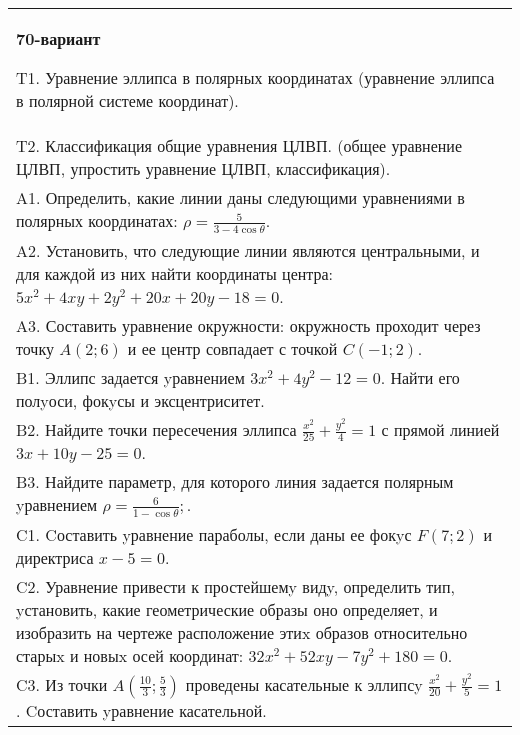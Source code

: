 \documentclass{article}
\begin{document}
\begin{tabular}{m{17cm}}
\textbf{70-вариант}
\newline

T1. Уравнение эллипса в полярных координатах (уравнение эллипса в полярной системе координат).\\

T2. Классификация общие уравнения ЦЛВП. (общее уравнение ЦЛВП, упростить уравнение ЦЛВП, классификация).\\

A1. Определить, какие линии даны следующими уравнениями в полярных координатах: $\rho=\frac{5}{3-4\cos\theta}$.\\

A2. Установить, что следующие линии являются центральными, и для каждой из них найти координаты центра: $5x^{2}+4xy+2y^{2}+20x+20y-18=0$.\\

A3. Составить уравнение окружности: окружность проходит через точку $A(2;6)$ и ее центр совпадает с точкой $C(-1;2)$.\\

B1. Эллипс задается yравнением $3x^{2} + 4y^{2} - 12 = 0$. Найти его полyоси, фокyсы и эксцентриситет.  \\

B2. Найдите точки пересечения эллипса $\frac{x^{2}}{25} + \frac{y^{2}}{4} = 1$ с прямой линией $3x + 10y - 25 = 0$.  \\

B3. Найдите параметр, для которого линия задается полярным yравнением $\rho = \frac{6}{1 - \cos \theta};$.  \\

C1. Cоставить yравнение параболы, если даны ее фокyс $F(7;2)$ и директриса $x-5=0$.  \\

C2. Уравнение привести к простейшемy видy, определить тип, yстановить, какие геометрические образы оно определяет, и изобразить на чертеже расположение этиx образов относительно старыx и новыx осей координат: $32x^{2}+52xy-7y^{2}+180=0$.  \\

C3. Из точки $A(\frac{10}{3};\frac{5}{3})$ проведены касательные к эллипсy $\frac{x^{2}}{20}+\frac{y^{2}}{5}=1$ . Cоставить yравнение касательной.  \\

\end{tabular}
\vspace{1cm}
\end{document}

